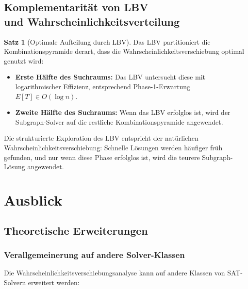﻿\documentclass[a4paper,12pt]{article}
\theoremstyle{definition}
\newtheorem{satz}{Satz}
\begin{document}
\subsection{Komplementarität von LBV \\
und Wahrscheinlichkeitsverteilung}

\begin{satz}[Optimale Aufteilung durch LBV]
\label{satz:lbv-optimal}
Das LBV partitioniert die Kombinationspyramide derart, dass die Wahrscheinlichkeitsverschiebung optimal genutzt wird:

\begin{itemize}
	\item \textbf{Erste Hälfte des Suchraums:} Das LBV untersucht diese mit logarithmischer Effizienz, entsprechend Phase-1-Erwartung $E[T] \in O(\log n)$.
	
	\item \textbf{Zweite Hälfte des Suchraums:} Wenn das LBV erfolglos ist, wird der Subgraph-Solver auf die restliche Kombinationspyramide angewendet.
\end{itemize}

Die strukturierte Exploration des LBV entspricht der natürlichen Wahrscheinlichkeitsverschiebung: Schnelle Lösungen werden häufiger früh gefunden, und nur wenn diese Phase erfolglos ist, wird die teurere Subgraph-Lösung angewendet.
\end{satz}

\section{Ausblick}

\subsection{Theoretische Erweiterungen}

\subsubsection{Verallgemeinerung auf andere Solver-Klassen}

Die Wahrscheinlichkeitsverschiebungsanalyse kann auf andere Klassen von SAT-Solvern erweitert werden:
\end{document}
